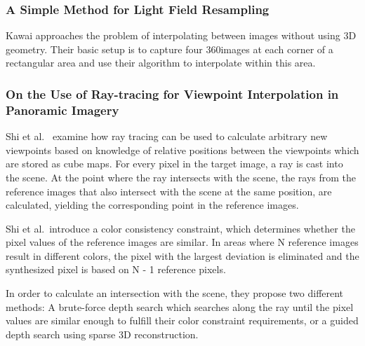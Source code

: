 \subsubsection{A Simple Method for Light Field Resampling}
Kawai \cite{simple_poster} approaches the problem of interpolating between images without using 3D geometry. Their basic setup is to capture four 360\degree images at each corner of a rectangular area and use their algorithm to interpolate within this area.


\subsubsection{On the Use of Ray-tracing for Viewpoint Interpolation in Panoramic Imagery}
Shi et al.\ \cite{raytracing} examine how ray tracing can be used to calculate arbitrary new viewpoints based on knowledge of relative positions between the viewpoints which are stored as cube maps. For every pixel in the target image, a ray is cast into the scene. At the point where the ray intersects with the scene, the rays from the reference images that also intersect with the scene at the same position, are calculated, yielding the corresponding point in the reference images.

Shi et al.\ introduce a color consistency constraint, which determines whether the pixel values of the reference images are similar. In areas where N reference images result in different colors, the pixel with the largest deviation is eliminated and the synthesized pixel is based on N - 1 reference pixels.

In order to calculate an intersection with the scene, they propose two different methods: A brute-force depth search which searches along the ray until the pixel values are similar enough to fulfill their color constraint requirements, or a guided depth search using sparse 3D reconstruction.

